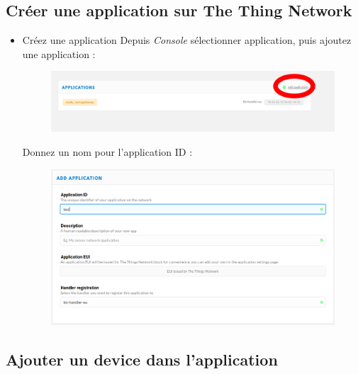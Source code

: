 \documentclass{article}
\begin{document}
\subsection{Créer une application sur The Thing Network}

\begin{itemize}


    \item Créez une application
    Depuis \textit{Console} sélectionner application, puis ajoutez une application :
    
    
    \begin{figure}[H]
\begin{center}
\advance\leftskip-3cm
\advance\rightskip-3cm
\includegraphics[keepaspectratio=true,scale=0.4]{add_appli.png}
\label{visina8}
\end{center}\end{figure}
    
    Donnez un nom pour l'application ID :
    
     \begin{figure}[H]
\begin{center}
\advance\leftskip-3cm
\advance\rightskip-3cm
\includegraphics[keepaspectratio=true,scale=0.4]{appli_id.png}
\label{visina8}
\end{center}\end{figure}

\end{itemize}
    
    \subsection{Ajouter un device dans l'application}
    
\end{document}
